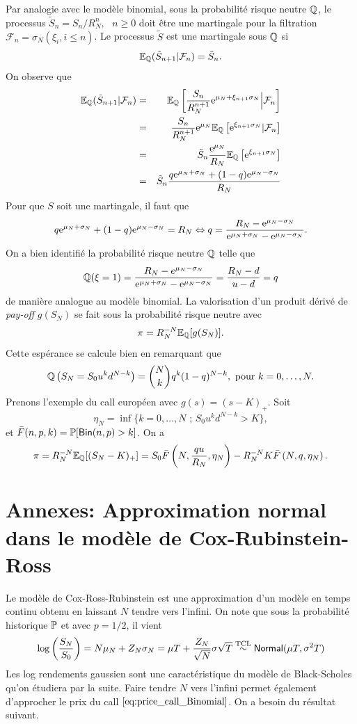 Par analogie avec le modèle binomial, sous la probabilité risque neutre $\mathbb{Q}$, le processus $\tilde{S}_n = S_n/R_N^n,\text{ }n\geq0$ doit être une martingale pour la filtration $\mathcal{F}_n = \sigma_N(\xi_i, i\leq n)$. Le processus $\tilde S$ est une martingale sous $\mathbb{Q}$ si
$$
\mathbb{E}_{\mathbb{Q}}(\tilde{S}_{n+1}|\mathcal{F}_{n}) =  \tilde S_{n}.
$$
On observe que 
\begin{eqnarray*}
\mathbb{E}_{\mathbb{Q}}(\tilde{S}_{n+1}|\mathcal{F}_{n})& =& \mathbb{E}_{\mathbb{Q}}\left[\frac{S_{n}}{R_N^{n+1}}\mathrm{e}^{\mu_N + \xi_{n+1}\sigma_N}\Big|\mathcal{F}_{n}\right]\\
& =& \frac{S_{n}}{R_N^{n+1}}\mathrm{e}^{\mu_N}\mathbb{E}_{\mathbb{Q}}\left[\mathrm{e}^{\xi_{n+1}\sigma_N}|\mathcal{F}_{n}\right]\\
& =& \tilde S_{n}\frac{\mathrm{e}^{\mu_N}}{R_N}\mathbb{E}_{\mathbb{Q}}\left[\mathrm{e}^{\xi_{n+1}\sigma_N}\right]\\
& =& \tilde S_{n}\frac{q\mathrm{e}^{\mu_N+\sigma_N}+ (1-q)\mathrm{e}^{\mu_N-\sigma_N} }{R_N}\\
\end{eqnarray*}
Pour que $S$ soit une martingale, il faut que 
$$
q\mathrm{e}^{\mu_N+\sigma_N}+ (1-q)\mathrm{e}^{\mu_N-\sigma_N} = R_N \Leftrightarrow q = \frac{R_N-\mathrm{e}^{\mu_N-\sigma_N}}{\mathrm{e}^{\mu_N+\sigma_N}-\mathrm{e}^{\mu_N-\sigma_N}}.
$$
On a bien identifié la probabilité risque neutre $\mathbb{Q}$ telle que 
$$
\mathbb{Q}(\xi = 1) = \frac{R_N-e^{\mu_N-\sigma_N}}{\mathrm{e}^{\mu_N+\sigma_N}-\mathrm{e}^{\mu_N-\sigma_N}}=\frac{R_N-d}{u-d}=q
$$
de manière analogue au modèle binomial. La valorisation d'un produit dérivé de \textit{pay-off} $g(S_N)$ se fait sous la probabilité risque neutre avec 
$$
\pi = R_N^{-N}\mathbb{E}_{\mathbb{Q}}[g(S_N)].
$$ 
Cette espérance se calcule bien en remarquant que 
$$
\mathbb{Q}\left(S_N = S_0u^kd^{N-k}\right) = \binom{N}{k}q^k(1-q)^{N-k},\text{ pour }k = 0,\ldots, N.
$$
Prenons l'exemple du call européen avec $g(s) = (s-K)_+$. Soit 
\begin{equation}\label{eq:eta}
\eta_N =\inf\{k = 0,\ldots, N\text{ ; }S_0u^kd^{N-k}>K\},
\end{equation}
et $\bar{F}(n,p,k) = \mathbb{P}[\mathsf{Bin}(n,p)> k]
$. On a 
\begin{equation}\label{eq:price_call_Binomial}
\pi = R_N^{-N}\mathbb{E}_{\mathbb{Q}}[(S_N-K)_+] = S_0\bar{F}\left(N,\frac{qu}{R_N},\eta_N\right)- R_N^{-N}K \bar{F}\left(N,q,\eta_N\right).
\end{equation}

\section{Annexes: Approximation normal dans le modèle de Cox-Rubinstein-Ross}
Le modèle de Cox-Ross-Rubinstein est une approximation d'un modèle en temps continu obtenu en laissant $N$ tendre vers l'infini. On note que sous la probabilité historique $\mathbb{P}$ et avec $p=1/2$, il vient
$$
\log\left(\frac{S_N}{S_0}\right) = N\mu_N+Z_N\sigma_N = \mu T + \frac{Z_N}{\sqrt{N}}\sigma\sqrt{T}\overset{\text{TCL}}{\sim}\mathsf{Normal}(\mu T, \sigma^2T)
$$
Les log rendements gaussien sont une caractéristique du modèle de Black-Scholes qu'on étudiera par la suite. Faire tendre $N$ vers l'infini permet également d'approcher le prix du call $\eqref{eq:price_call_Binomial}$. On a besoin du résultat suivant. 

